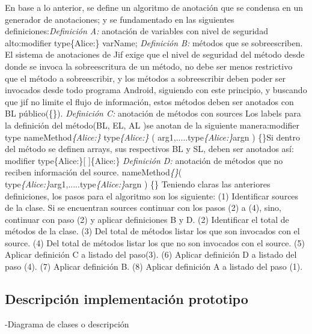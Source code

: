 En base a lo anterior, se define un algoritmo de anotación que se condensa en un
generador de anotaciones; y se fundamentado en las siguientes
definiciones:\newline \textit{Definición A:} anotación de variables con nivel de
seguridad alto:\newline modifier type\{Alice:\} varName;\newline 
\textit{Definición B:} métodos que se sobreescriben. El sistema de anotaciones
de Jif exige que el nivel de seguridad del método desde donde se invoca la
sobreescritura de un método, no debe ser menos restrictivo que el método a
sobreescribir, y los métodos a sobreescribir deben poder ser invocados desde
todo programa Android, siguiendo con este principio, y buscando que jif no
limite el flujo de información, estos métodos deben ser anotados con BL
público(\{\}).\newline 
\textit{Definición C:} anotación de métodos con sources\newline
Los labels para la definición del método(BL, EL, AL )se anotan de la
siguiente manera:\newline modifier type
nameMethod\textit{\{Alice:\}} type\textit{\{Alice:\}}
( arg1,.....type\textit{\{Alice:\}}argn ) \{\}\newline Si dentro del método se
definen arrays, sus respectivos BL y SL, deben ser anotados así: modifier type\{Alice:\}[ ]\{Alice:\}\newline
\textit{Definición D:} anotación de métodos que no reciben información del
source. 
nameMethod\textit{\{\}}(
type\textit{\{Alice:\}}arg1,.....type\textit{\{Alice:\}}argn ) \{\}\newline
Teniendo claras las anteriores definiciones, los pasos para el algoritmo son los
siguiente:\newline
(1) Identificar sources de la clase. Si se encuentran sources continuar con
los pasos (2) a (4), sino, continuar con paso (2) y aplicar definiciones B y
D.\newline
(2) Identificar el total de métodos de la clase.\newline
(3) Del total de métodos listar los que son invocados con el source.\newline
(4) Del total de métodos listar los que no son invocados con el source.\newline
(5) Aplicar definición C a listado del paso(3).\newline
(6) Aplicar definición D a listado del paso (4).\newline
(7) Aplicar definición B. \newline
(8) Aplicar definición A a listado del paso (1).

\subsection{Descripción implementación prototipo}
-Diagrama de clases o descripción

